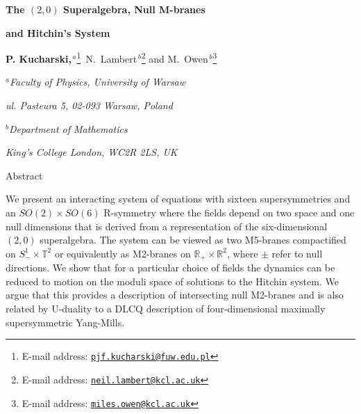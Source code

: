 \documentclass[12pt]{article}
\numberwithin{equation}{section}
\begin{document}
\renewcommand{\thefootnote}{\fnsymbol{footnote}}

 

   \vspace{1.8truecm}

 \centerline{\LARGE \bf {\sc  The $(2,0)$ Superalgebra, Null M-branes}}
 \vskip 12pt
 
 \centerline{\LARGE \bf {\sc  and Hitchin's System} }
 
\vskip 2cm

  \centerline{
   {\large {\bf  {\sc P. Kucharski,${}^{\,a}$}}\footnote{E-mail address: \href{mailto:pjf.kucharski@fuw.edu.pl}{\tt pjf.kucharski@fuw.edu.pl}}     \,{\sc N.~Lambert$^{\,b}$}\footnote{E-mail address: \href{mailto:neil.lambert@kcl.ac.uk}{\tt neil.lambert@kcl.ac.uk}}  {\sc    and M.~Owen${}^{\,b}$}}\footnote{E-mail address: \href{mailto:miles.owen@kcl.ac.uk}{\tt miles.owen@kcl.ac.uk}}  }    
\vspace{1cm}
\centerline{${}^a${\it Faculty of Physics, University of Warsaw}}
\centerline{{\it ul. Pasteura 5, 02-093 Warsaw, Poland}} 
  
\vspace{1cm}
\centerline{${}^b${\it Department of Mathematics}}
\centerline{{\it King's College London, WC2R 2LS, UK}} 

\vspace{1.0truecm}

 
\thispagestyle{empty}

\centerline{\sc Abstract}
\vspace{0.4truecm}
\begin{center}
\begin{minipage}[c]{360pt}{
We present an interacting  system of equations with sixteen supersymmetries and an $SO(2)\times SO(6)$ R-symmetry where the fields depend on two space and one null dimensions that is derived from a representation of the six-dimensional $(2,0)$ superalgebra. The system can be viewed as two M5-branes compactified on $S^1_-\times {\mathbb T}^2$ or equivalently as M2-branes on ${\mathbb R}_+\times {\mathbb R}^2$,  where $\pm$ refer to null directions. We show that for a particular choice of fields the dynamics can be reduced to motion on the moduli space of solutions to the Hitchin system. We argue that this provides a description of intersecting null M2-branes and is also related by U-duality to a DLCQ description of four-dimensional maximally supersymmetric Yang-Mills.
 }

\end{minipage}
\end{center}
 
\end{document}
